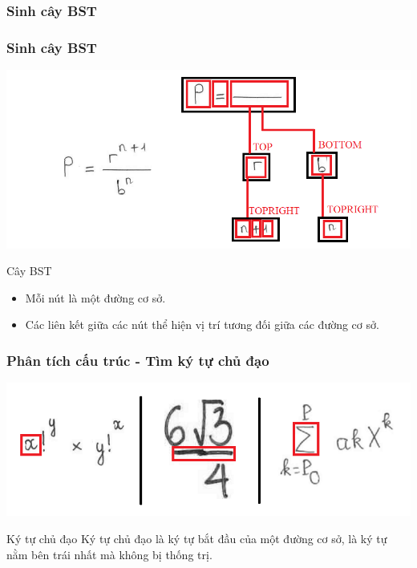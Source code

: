 \documentclass{beamer}
\begin{document}
\subsubsection{Sinh cây BST}
\begin{frame}
	\frametitle{Sinh cây BST}
	\begin{center}
		\centering
		\includegraphics[width=0.6\linewidth]{BST.png}
		\vspace{0.5cm}
	\end{center}
	\begin{block}{Cây BST}
		\begin{itemize}
			\item Mỗi nút là một đường cơ sở.
			\item Các liên kết giữa các nút thể hiện vị trí tương đối giữa các đường cơ sở.
		\end{itemize}
	\end{block}
\end{frame}

\begin{frame}
	\frametitle{Phân tích cấu trúc - Tìm ký tự chủ đạo}
	\begin{center}
		\centering
		\includegraphics[width=0.8\linewidth]{base.png}
		\vspace{0.5cm}
	\end{center}
	\begin{block}{Ký tự chủ đạo}
		Ký tự chủ đạo là ký tự bắt đầu của một đường cơ sở, là ký tự nằm bên trái nhất mà không bị thống trị.
	\end{block}
	
\end{frame}
\end{document}
